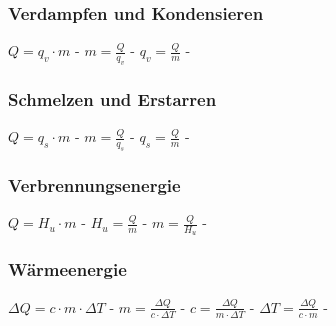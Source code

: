 \subsubsection{Verdampfen und Kondensieren} 
\begin{minipage}{0.45\textwidth} 
\end{minipage} 
\begin{minipage}{0.45\textwidth} 
 
\legende{}\end{minipage} 
 
$ Q =q_{v} \cdot m $ - $ m = \frac{Q}{q_{v} } $ - $ q_{v}  = \frac{Q}{m} $ - \\ 
 
\subsubsection{Schmelzen und Erstarren} 
\begin{minipage}{0.45\textwidth} 
\end{minipage} 
\begin{minipage}{0.45\textwidth} 
 
\legende{}\end{minipage} 
 
$ Q = q_{s} \cdot m $ - $ m = \frac{Q}{q_{s} } $ - $ q_{s}  = \frac{Q}{m} $ - \\ 
 
\subsubsection{Verbrennungsenergie} 
\begin{minipage}{0.45\textwidth} 
\end{minipage} 
\begin{minipage}{0.45\textwidth} 
 
\legende{}\end{minipage} 
 
$ Q = H_{u} \cdot m $ - $ H_{u}  = \frac{Q}{m} $ - $ m = \frac{Q}{H_{u} } $ - \\ 
 
\subsubsection{Wärmeenergie} 
\begin{minipage}{0.45\textwidth} 
\end{minipage} 
\begin{minipage}{0.45\textwidth} 
 
\legende{}\end{minipage} 
 
$ \Delta Q = c\cdot m\cdot \Delta T $ - $ m = \frac{ \Delta Q}{c\cdot \Delta T} $ - $ c = \frac{ \Delta Q}{m\cdot \Delta T} $ - $ \Delta T = \frac{\Delta Q}{c\cdot m} $ - \\ 
 
